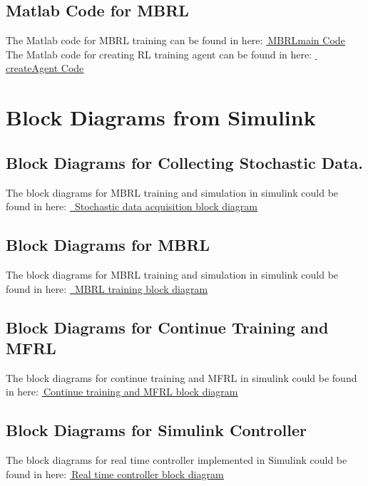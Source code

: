 \subsection*{Matlab Code for MBRL}
\label{code:mbrl}
The Matlab code for MBRL training can be found in here: \href{https://github.com/n7729697/KTH-MasterThesis/blob/main/code/MBRLmain.mlx}{\faGithub\,\underline{MBRLmain Code}}
The Matlab code for creating RL training agent can be found in here: \href{https://github.com/n7729697/KTH-MasterThesis/blob/main/code/createAgent.mlx}{\faGithub\,\underline{createAgent Code}}

\section{Block Diagrams from Simulink}
\subsection*{Block Diagrams for Collecting Stochastic Data.}
The block diagrams for MBRL training and simulation in simulink could be found in here: \href{https://github.com/n7729697/KTH-MasterThesis/blob/main/img/AppB/ModelRobot.pdf}{\faGithub\,\underline{ Stochastic data acquisition block diagram}}
\subsection*{Block Diagrams for MBRL}
The block diagrams for MBRL training and simulation in simulink could be found in here: \href{https://github.com/n7729697/KTH-MasterThesis/blob/main/img/AppB/RLtrot.pdf}{\faGithub\,\underline{ MBRL training block diagram}}
\subsection*{Block Diagrams for Continue Training and MFRL}
The block diagrams for continue training and MFRL in simulink could be found in here: \href{https://github.com/n7729697/KTH-MasterThesis/blob/main/img/AppB/RLvali.pdf}{\faGithub\,\underline{Continue training and MFRL block diagram}}
\subsection*{Block Diagrams for Simulink Controller}
The block diagrams for real time controller implemented in Simulink could be found in here:  \href{https://github.com/n7729697/KTH-MasterThesis/blob/main/img/AppB/controller.pdf}{\faGithub\,\underline{Real time controller block diagram}}

